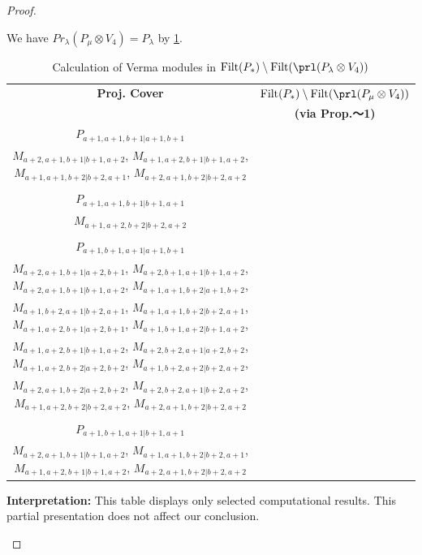 \begin{proof}
\begin{enumerate}
\begin{enumerate}
\begin{equation}
\end{equation}
       We have $Pr_{\lambda}(P_\mu \otimes V_{4}) = P_\lambda  $ by \cref{tab:verma-analysis_c_9}.
\begin{table}[htbp]
\centering
\caption{Calculation of Verma modules in $\operatorname{Filt}(P_*) \setminus \operatorname{Filt}(\prl(P_\lambda \otimes V_{4})) $ } \label{tab:verma-analysis_c_9}
\begin{tabular}{cc}
\toprule
\textbf{Proj. Cover} & \textbf{$\operatorname{Filt}(P_*) \setminus \operatorname{Filt}(\prl(P_\mu \otimes V_{4})) $}  \\
     & \textbf{(via Prop.～1)}  \\
\midrule
 $P_{a+1,a+1,b+1|a+1,b+1}$ & \makecell{
 $M_{a+2,a+1,b+1|a+2,b+1}$,
 $M_{a+1,a+2,b+1|a+2,b+1}$,
 $M_{a+1,a+1,b+2|a+1,b+2}$,
 $M_{a+2,a+1,b+2|a+2,b+2}$, \\
 $M_{a+2,a+1,b+1|b+1,a+2}$,
 $M_{a+1,a+2,b+1|b+1,a+2}$,
 $M_{a+1,a+1,b+2|b+2,a+1}$,
 $M_{a+2,a+1,b+2|b+2,a+2}$
}\\
 & \\
 $P_{a+1,a+1,b+1|b+1,a+1}$ & \makecell{
 $M_{a+2,a+1,b+1|b+1,a+2}$,
 $M_{a+1,a+2,b+1|b+1,a+2}$,
 $M_{a+1,a+1,b+2|b+2,a+1}$,
 $M_{a+2,a+1,b+2|b+2,a+2}$, \\
 $M_{a+1,a+2,b+2|b+2,a+2}$
}\\
 & \\
 $P_{a+1,b+1,a+1|a+1,b+1}$ & \makecell{
 $M_{a+2,b+1,a+1|a+2,b+1}$,
 $M_{a+1,b+2,a+1|a+1,b+2}$,
 $M_{a+1,b+1,a+2|a+2,b+1}$,
 $M_{a+1,b+2,a+2|a+2,b+2}$, \\
 $M_{a+2,a+1,b+1|a+2,b+1}$,
 $M_{a+2,b+1,a+1|b+1,a+2}$,
 $M_{a+2,a+1,b+1|b+1,a+2}$,
 $M_{a+1,a+1,b+2|a+1,b+2}$, \\
 $M_{a+1,b+2,a+1|b+2,a+1}$,
 $M_{a+1,a+1,b+2|b+2,a+1}$,
 $M_{a+1,a+2,b+1|a+2,b+1}$,
 $M_{a+1,b+1,a+2|b+1,a+2}$, \\
 $M_{a+1,a+2,b+1|b+1,a+2}$,
 $M_{a+2,b+2,a+1|a+2,b+2}$,
 $M_{a+1,a+2,b+2|a+2,b+2}$,
 $M_{a+1,b+2,a+2|b+2,a+2}$, \\
 $M_{a+2,a+1,b+2|a+2,b+2}$,
 $M_{a+2,b+2,a+1|b+2,a+2}$,
 $M_{a+1,a+2,b+2|b+2,a+2}$,
 $M_{a+2,a+1,b+2|b+2,a+2}$
}\\
 & \\
 $P_{a+1,b+1,a+1|b+1,a+1}$ & \makecell{
 $M_{a+2,b+1,a+1|b+1,a+2}$,
 $M_{a+1,b+2,a+1|b+2,a+1}$,
 $M_{a+1,b+1,a+2|b+1,a+2}$,
 $M_{a+2,b+2,a+1|b+2,a+2}$, \\
 $M_{a+2,a+1,b+1|b+1,a+2}$,
 $M_{a+1,a+1,b+2|b+2,a+1}$,
 $M_{a+1,a+2,b+1|b+1,a+2}$,
 $M_{a+2,a+1,b+2|b+2,a+2}$
}\\
\bottomrule
\end{tabular}
\vspace{0.5em}
\parbox{\linewidth}{\small
\textbf{Interpretation:}
This table displays only selected computational results. This partial presentation does not affect our conclusion.
}
\end{table}


\end{enumerate}
\end{enumerate}
\end{proof}
